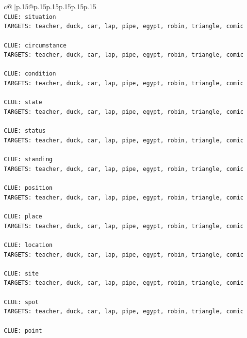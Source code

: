 \documentclass{article}
\begin{document}
{\begin{supertabular}{c@{$\;$}|p{.15\linewidth}@{}p{.15\linewidth}p{.15\linewidth}p{.15\linewidth}p{.15\linewidth}p{.15\linewidth}}
{{{\\ 
\texttt{CLUE: situation} \\
\texttt{TARGETS: teacher, duck, car, lap, pipe, egypt, robin, triangle, comic} \\
\\ 
\texttt{CLUE: circumstance} \\
\texttt{TARGETS: teacher, duck, car, lap, pipe, egypt, robin, triangle, comic} \\
\\ 
\texttt{CLUE: condition} \\
\texttt{TARGETS: teacher, duck, car, lap, pipe, egypt, robin, triangle, comic} \\
\\ 
\texttt{CLUE: state} \\
\texttt{TARGETS: teacher, duck, car, lap, pipe, egypt, robin, triangle, comic} \\
\\ 
\texttt{CLUE: status} \\
\texttt{TARGETS: teacher, duck, car, lap, pipe, egypt, robin, triangle, comic} \\
\\ 
\texttt{CLUE: standing} \\
\texttt{TARGETS: teacher, duck, car, lap, pipe, egypt, robin, triangle, comic} \\
\\ 
\texttt{CLUE: position} \\
\texttt{TARGETS: teacher, duck, car, lap, pipe, egypt, robin, triangle, comic} \\
\\ 
\texttt{CLUE: place} \\
\texttt{TARGETS: teacher, duck, car, lap, pipe, egypt, robin, triangle, comic} \\
\\ 
\texttt{CLUE: location} \\
\texttt{TARGETS: teacher, duck, car, lap, pipe, egypt, robin, triangle, comic} \\
\\ 
\texttt{CLUE: site} \\
\texttt{TARGETS: teacher, duck, car, lap, pipe, egypt, robin, triangle, comic} \\
\\ 
\texttt{CLUE: spot} \\
\texttt{TARGETS: teacher, duck, car, lap, pipe, egypt, robin, triangle, comic} \\
\\ 
\texttt{CLUE: point} \\
}}}
\end{supertabular}}
\end{document}
